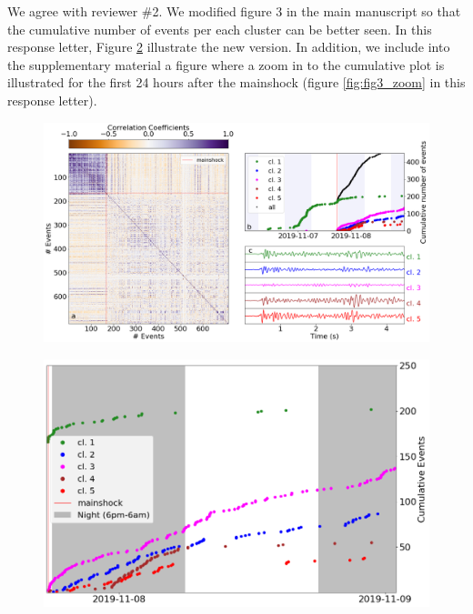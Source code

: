 \documentclass[10pt]{extarticle}
\begin{document}
\begin{Answer}
We agree with reviewer \#2. We modified figure 3 in the main manuscript so that the cumulative number of events per each cluster can be better seen. In this response letter, Figure \ref{fig:fig3_improved} illustrate the new version. In addition, we include into the supplementary material a figure where a zoom in to the cumulative plot is illustrated for the first 24 hours after the mainshock (figure \ref{fig:fig3_zoom} in this response letter). 
\begin{figure}[!h]
\begin{center}
 \includegraphics[width=1\linewidth]{wigg_cc_mat_cluster.png} 
\end{center}
\label{fig:fig3_improved}
\end{figure}
\begin{figure}[!h]
\begin{center}
 \includegraphics[width=1\linewidth]{S4_cumulative_per_cluster_zoom.png} 
\end{center}
\label{fig:fig3_improved}
\end{figure}
 \WorkInProgressRevTask
\end{Answer}
%
%
\end{document}

